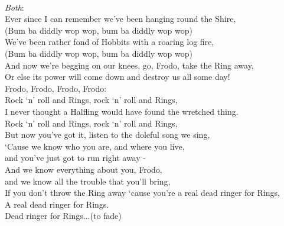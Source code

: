 \begin{multicols}{2}
\\
\textit{Both}:
\\
Ever since I can remember we’ve been hanging round the Shire,
\\
(Bum ba diddly wop wop, bum ba diddly wop wop)
\\
We’ve been rather fond of Hobbits with a roaring log fire,
\\
(Bum ba diddly wop wop, bum ba diddly wop wop)
\\
And now we’re begging on our knees, go, Frodo, take the Ring away,
\\
Or else its power will come down and destroy us all some day!
\\
Frodo, Frodo, Frodo, Frodo:
\\
Rock ‘n’ roll and Rings, rock ‘n’ roll and Rings,
\\
I never thought a Halfling would have found the wretched thing.
\\
Rock ‘n’ roll and Rings, rock ‘n’ roll and Rings,
\\
But now you’ve got it, listen to the doleful song we sing,
\\
‘Cause we know who you are, and where you live,
\\
and you’ve just got to run right away -
\\
And we know everything about you, Frodo, 
\\
and we know all the trouble that you’ll bring,
\\
If you don’t throw the Ring away ‘cause you’re a real dead ringer for Rings,
\\
A real dead ringer for Rings.
\\
Dead ringer for Rings...(to fade)
\end{multicols}